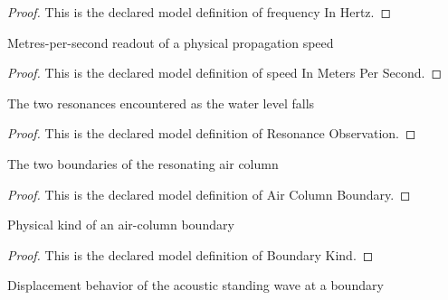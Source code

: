 \begin{proof}
  This is the declared model definition of frequency In Hertz.
\end{proof}
\begin{definition}
  \label{def:physics:phyx-mini-0223:phyxminiproblems-problemphyxmini0223-speedinmeterspersecond}
  Metres-per-second readout of a physical propagation speed
\end{definition}
\begin{proof}
  This is the declared model definition of speed In Meters Per Second.
\end{proof}
\begin{definition}
  \label{def:physics:phyx-mini-0223:phyxminiproblems-problemphyxmini0223-resonanceobservation}
  The two resonances encountered as the water level falls
\end{definition}
\begin{proof}
  This is the declared model definition of Resonance Observation.
\end{proof}
\begin{definition}
  \label{def:physics:phyx-mini-0223:phyxminiproblems-problemphyxmini0223-aircolumnboundary}
  The two boundaries of the resonating air column
\end{definition}
\begin{proof}
  This is the declared model definition of Air Column Boundary.
\end{proof}
\begin{definition}
  \label{def:physics:phyx-mini-0223:phyxminiproblems-problemphyxmini0223-boundarykind}
  Physical kind of an air-column boundary
\end{definition}
\begin{proof}
  This is the declared model definition of Boundary Kind.
\end{proof}
\begin{definition}
  \label{def:physics:phyx-mini-0223:phyxminiproblems-problemphyxmini0223-displacementboundarybehavior}
  Displacement behavior of the acoustic standing wave at a boundary
\end{definition}
